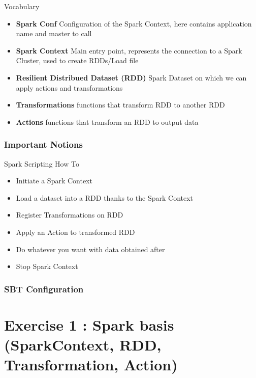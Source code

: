 \documentclass[slidetop,9pt,utf8]{beamer}
\begin{document}
\begin{CJK}{UTF8}{gbsn}
\begin{frame}
  \begin{block}{Vocabulary}
    \begin{itemize}
      \item \textbf{Spark Conf} Configuration of the Spark Context, here contains application name and master to call
      \item \textbf{Spark Context} Main entry point, represents the connection to a Spark Cluster, used to create RDDs/Load file
      \item \textbf{Resilient Distribued Dataset (RDD)} Spark Dataset on which we can apply actions and transformations
      \item \textbf{Transformations} functions that transform RDD to another RDD
      \item \textbf{Actions} functions that transform an RDD to output data
    \end{itemize}
  \end{block}

\end{frame}

\begin{frame}
  \frametitle{Important Notions}

  \begin{block}{Spark Scripting How To}
    \begin{itemize}
      \item Initiate a Spark Context
      \item Load a dataset into a RDD thanks to the Spark Context
      \item Register Transformations on RDD
      \item Apply an Action to transformed RDD
      \item Do whatever you want with data obtained after 
      \item Stop Spark Context
    \end{itemize}
  \end{block}

\end{frame}

\begin{frame}
  \frametitle{SBT Configuration}

  

\end{frame}

\section{Exercise 1 : Spark basis (SparkContext, RDD, Transformation, Action)}


\end{CJK}
\end{document}
